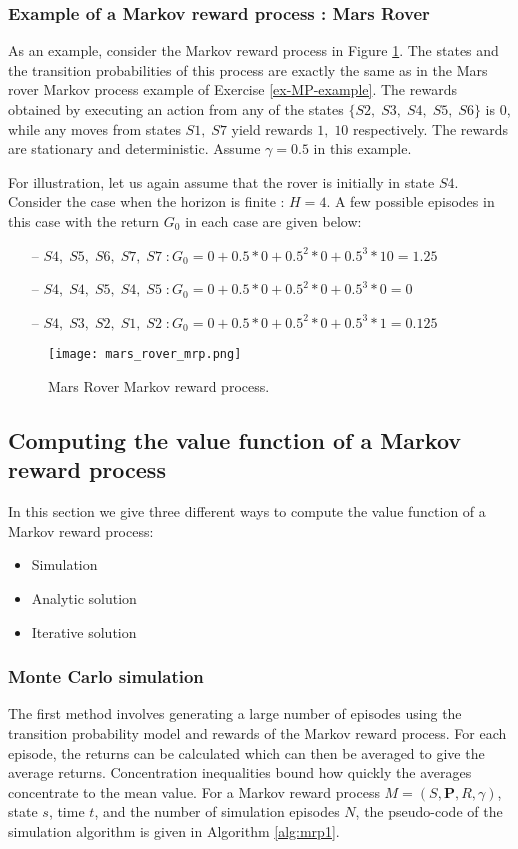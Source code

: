 \documentclass{article}
\theoremstyle{definition}
\theoremstyle{remark}
\begin{document}
\subsubsection{Example of a Markov reward process : Mars Rover}
\label{MRP-example-subsubsection}
As an example, consider the Markov reward process in Figure \ref{fig:MRP}. The states and the transition probabilities of this process are exactly the same as in the Mars rover Markov process example of Exercise \ref{ex-MP-example}. The rewards obtained by executing an action from any of the states $\{S2,\;S3,\;S4,\;S5,\;S6\}$ is $0$, while any moves from states $S1,\;S7$ yield rewards $1,\;10$ respectively. The rewards are stationary and deterministic. Assume $\gamma = 0.5$ in this example.

For illustration, let us again assume that the rover is initially in state $S4$. Consider the case when the horizon is finite : $H=4$.  A few possible episodes in this case with the return $G_0$ in each case are given below:
\begin{itemize}
\item[--] $S4,\; S5,\; S6,\; S7,\; S7\; : G_0 = 0 + 0.5 \ast 0 + 0.5^2 \ast 0 + 0.5^3 \ast 10 = 1.25$
\item[--] $S4,\; S4,\; S5,\; S4,\; S5\; : G_0 = 0 + 0.5 \ast 0 + 0.5^2 \ast 0 + 0.5^3 \ast 0 = 0$
\item[--] $S4,\; S3,\; S2,\; S1,\; S2\; : G_0 = 0 + 0.5 \ast 0 + 0.5^2 \ast 0 + 0.5^3 \ast 1 = 0.125$
\end{itemize}

\begin{figure}[h]
    \centering
    \texttt{[image: mars\_rover\_mrp.png]}
    \caption{Mars Rover Markov reward process.}
    \label{fig:MRP}
\end{figure}

\subsection{Computing the value function of a Markov reward process}
In this section we give three different ways to compute the value function of a Markov reward process:
\begin{itemize}
\item Simulation
\item Analytic solution
\item Iterative solution
\end{itemize}

\subsubsection{Monte Carlo simulation}
The first method involves generating a large number of episodes using the transition probability model and rewards of the Markov reward process. For each episode, the returns can be calculated which can then be averaged to give the average returns. Concentration inequalities bound how quickly the averages concentrate to the mean value. For a Markov reward process $M = (S,\mathbf{P},R,\gamma)$, state $s$, time $t$, and the number of simulation episodes $N$, the pseudo-code of the simulation algorithm is given in Algorithm \ref{alg:mrp1}.
\end{document}
